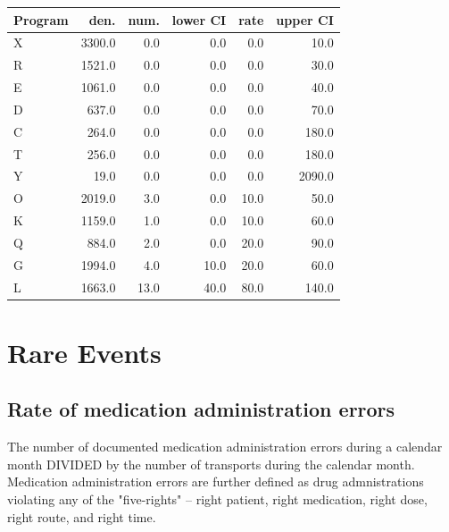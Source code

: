 \documentclass[twoside]{article}\usepackage[]{graphicx}\usepackage[]{color}
\begin{document}
\begin{table}[ht]
\centering
\begin{tabular}{lrrrrr}
  \hline
Program & den. & num. & lower CI & rate & upper CI \\ 
  \hline
X & 3300.0 & 0.0 & 0.0 & 0.0 & 10.0 \\ 
  R & 1521.0 & 0.0 & 0.0 & 0.0 & 30.0 \\ 
  E & 1061.0 & 0.0 & 0.0 & 0.0 & 40.0 \\ 
  D & 637.0 & 0.0 & 0.0 & 0.0 & 70.0 \\ 
  C & 264.0 & 0.0 & 0.0 & 0.0 & 180.0 \\ 
  T & 256.0 & 0.0 & 0.0 & 0.0 & 180.0 \\ 
  Y & 19.0 & 0.0 & 0.0 & 0.0 & 2090.0 \\ 
  O & 2019.0 & 3.0 & 0.0 & 10.0 & 50.0 \\ 
  K & 1159.0 & 1.0 & 0.0 & 10.0 & 60.0 \\ 
  Q & 884.0 & 2.0 & 0.0 & 20.0 & 90.0 \\ 
  G & 1994.0 & 4.0 & 10.0 & 20.0 & 60.0 \\ 
  L & 1663.0 & 13.0 & 40.0 & 80.0 & 140.0 \\ 
   \hline
\end{tabular}
\end{table}



\newpage
\section{Rare Events}
\subsection{Rate of medication administration errors}
The number of documented medication administration errors during a calendar month DIVIDED by the number of transports during the calendar month. Medication administration errors are further defined as drug admnistrations violating any of the "five-rights" -- right patient, right medication, right dose, right route, and right time.
\end{document}
